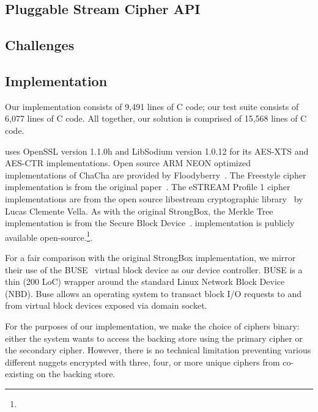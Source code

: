 
\subsection{Pluggable Stream Cipher API}


\subsection{Challenges}



\subsection{Implementation}

Our \SYSTEM{} implementation consists of 9,491 lines of C code; our test suite
consists of 6,077 lines of C code. All together, our solution is comprised of
15,568 lines of C code.

\SYSTEM{} uses OpenSSL version 1.1.0h and LibSodium version 1.0.12 for its
AES-XTS and AES-CTR implementations. Open source ARM NEON optimized
implementations of ChaCha are provided by Floodyberry~\cite{Floodyberry}. The
Freestyle cipher implementation is from the original paper~\cite{Freestyle}. The
eSTREAM Profile 1 cipher implementations are from the open source libestream
cryptographic library~\cite{libestream} by Lucas Clemente Vella. As with the
original StrongBox, the Merkle Tree implementation is from the Secure Block
Device~\cite{SBD}. \SYSTEM{} implementation is publicly available
open-source.\footnote{\SystemURI}.

For a fair comparison with the original StrongBox implementation, we mirror
their use of the BUSE~\cite{BUSE} virtual block device as our device controller.
BUSE is a thin (200 LoC) wrapper around the standard Linux Network Block Device
(NBD). Buse allows an operating system to transact block I/O requests to and
from virtual block devices exposed via domain socket.

For the purposes of our implementation, we make the choice of ciphers binary:
either the system wants \SYSTEM{} to access the backing store using the primary
cipher or the secondary cipher. However, there is no technical limitation
preventing various different nuggets encrypted with three, four, or more unique
ciphers from co-existing on the backing store.

